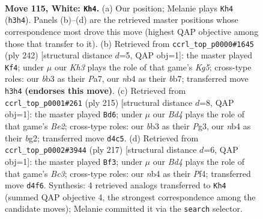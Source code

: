 \documentclass[11pt]{article}
\begin{document}
\clearpage

\begin{figure}[p]\centering
\begin{subfigure}{0.46\textwidth}\centering
\resizebox{\linewidth}{!}{%
\newchessgame
\chessboard[
  setfen={8/8/7k/8/1n1B4/1b5K/5P2/8 w - - 75 115},
  showmover=false,
  pgfstyle=straightmove, color=movearrow, markmove={h3-h4}
]}
\caption{}
\end{subfigure}\hfill
\begin{subfigure}{0.46\textwidth}\centering
\resizebox{\linewidth}{!}{%
\newchessgame
\chessboard[
  setfen={5B2/Pb6/4k3/2P3K1/8/8/8/8 w - - 13 122},
  showmover=false,
  pgfstyle=straightmove, color=movearrow, markmove={g5-f4}
]}
\caption{}
\end{subfigure}
\\[4pt]
\begin{subfigure}{0.46\textwidth}\centering
\resizebox{\linewidth}{!}{%
\newchessgame
\chessboard[
  setfen={8/4b3/1k6/2p5/8/1K4p1/6B1/8 b - - 87 108},
  showmover=false,
  pgfstyle=straightmove, color=movearrow, markmove={e7-d6}
]}
\caption{}
\end{subfigure}\hfill
\begin{subfigure}{0.46\textwidth}\centering
\resizebox{\linewidth}{!}{%
\newchessgame
\chessboard[
  setfen={8/8/2b5/B3k2p/5p2/8/8/5K2 b - - 65 109},
  showmover=false,
  pgfstyle=straightmove, color=movearrow, markmove={c6-f3}
]}
\caption{}
\end{subfigure}
\caption{\textbf{Move 115, White: \texttt{Kh4}.} (a) Our position; Melanie plays \texttt{Kh4} (\texttt{h3h4}). Panels (b)--(d) are the retrieved master positions whose correspondence most drove this move (highest QAP objective among those that transfer to it). (b) Retrieved from \texttt{ccrl\_top\_p0000\#1645} (ply 242) [structural distance $d$=5, QAP obj=1]: the master played \texttt{Kf4}; under $\mu$ our \emph{Kh3} plays the role of that game's \emph{Kg5}; cross-type roles: our \emph{b}b3 as their \emph{P}a7, our \emph{n}b4 as their \emph{b}b7; transferred move \texttt{h3h4} \textbf{(endorses this move)}. (c) Retrieved from \texttt{ccrl\_top\_p0001\#261} (ply 215) [structural distance $d$=8, QAP obj=1]: the master played \texttt{Bd6}; under $\mu$ our \emph{Bd4} plays the role of that game's \emph{Be2}; cross-type roles: our \emph{b}b3 as their \emph{P}g3, our \emph{n}b4 as their \emph{b}g2; transferred move \texttt{d4c5}. (d) Retrieved from \texttt{ccrl\_top\_p0002\#3944} (ply 217) [structural distance $d$=6, QAP obj=1]: the master played \texttt{Bf3}; under $\mu$ our \emph{Bd4} plays the role of that game's \emph{Bc3}; cross-type roles: our \emph{n}b4 as their \emph{P}f4; transferred move \texttt{d4f6}. Synthesis: 4 retrieved analogs transferred to \texttt{Kh4} (summed QAP objective 4, the strongest correspondence among the candidate moves); Melanie committed it via the \texttt{search} selector.}
\label{fig:thought-m228}
\end{figure}
\end{document}
